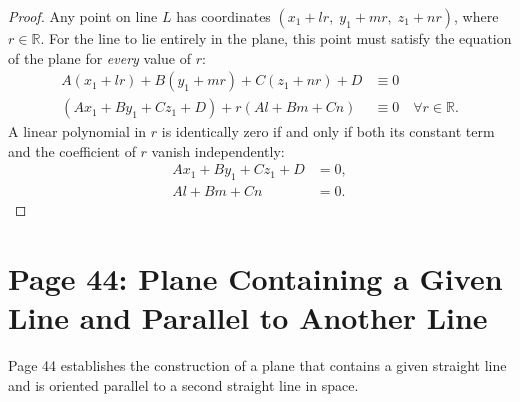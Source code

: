 \begin{proof}
Any point on line $L$ has coordinates $(x_1 + lr, \; y_1 + mr, \; z_1 + nr)$, where $r \in \mathbb{R}$.
For the line to lie entirely in the plane, this point must satisfy the equation of the plane for \emph{every} value of $r$:
\begin{align}
    A(x_1 + lr) + B(y_1 + mr) + C(z_1 + nr) + D &\equiv 0 \nonumber\\
    (Ax_1 + By_1 + Cz_1 + D) + r(Al + Bm + Cn) &\equiv 0 \quad \forall r \in \mathbb{R}.
\end{align}
A linear polynomial in $r$ is identically zero if and only if both its constant term and the coefficient of $r$ vanish independently:
\begin{align}
    Ax_1 + By_1 + Cz_1 + D &= 0, \\
    Al + Bm + Cn &= 0.
\end{align}
\end{proof}

\section{Page 44: Plane Containing a Given Line and Parallel to Another Line}
\label{sec:page44}

\begin{conceptbox}
Page 44 establishes the construction of a plane that contains a given straight line and is oriented parallel to a second straight line in space.
\end{conceptbox}

